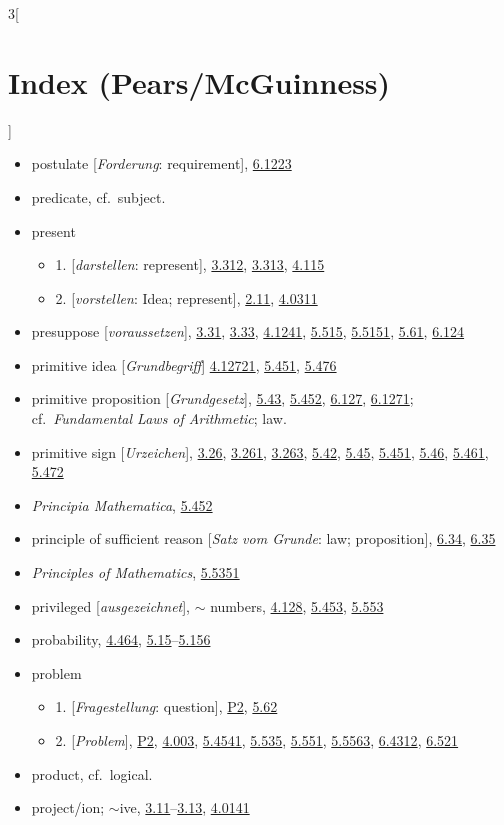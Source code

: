 \documentclass[oneside,openany,12pt]{book}
\newcommand{\indexentry}[1]{\item #1}
\newcommand{\indexsubentry}[1]{\begin{itemize} \item #1 \end{itemize}}
\newcommand{\indexref}[1]{\hyperlink{prop#1}{#1}}
\begin{document}
\begin{multicols}{3}[\section*{Index (Pears/McGuinness)}]
\begin{itemize}
\indexentry{postulate [\textit{Forderung}: requirement], \indexref{6.1223}}

\indexentry{predicate, cf.\ subject.}

\indexentry{present}

   \indexsubentry{1. [\textit{darstellen}: represent], \indexref{3.312}, \indexref{3.313}, \indexref{4.115}}

   \indexsubentry{2. [\textit{vorstellen}: Idea; represent], \indexref{2.11}, \indexref{4.0311}}

\indexentry{presuppose [\textit{voraussetzen}], \indexref{3.31}, \indexref{3.33}, \indexref{4.1241}, \indexref{5.515}, \indexref{5.5151}, \indexref{5.61}, \indexref{6.124}}

\indexentry{primitive idea [\textit{Grundbegriff}] \indexref{4.12721}, \indexref{5.451}, \indexref{5.476}}

\indexentry{primitive proposition [\textit{Grundgesetz}], \indexref{5.43}, \indexref{5.452}, \indexref{6.127}, \indexref{6.1271}; cf.\ \textit{Fundamental Laws of Arithmetic}; law.}

\indexentry{primitive sign [\textit{Urzeichen}], \indexref{3.26}, \indexref{3.261}, \indexref{3.263}, \indexref{5.42}, \indexref{5.45}, \indexref{5.451}, \indexref{5.46}, \indexref{5.461}, \indexref{5.472}}

\indexentry{\textit{Principia Mathematica}, \indexref{5.452}}

\indexentry{principle of sufficient reason [\textit{Satz vom Grunde}: law; proposition], \indexref{6.34}, \indexref{6.35}}

\indexentry{\textit{Principles of Mathematics}, \indexref{5.5351}}

\indexentry{privileged [\textit{ausgezeichnet}], $\sim$ numbers, \indexref{4.128}, \indexref{5.453}, \indexref{5.553}}

\indexentry{probability, \indexref{4.464}, \indexref{5.15}--\indexref{5.156}}

\indexentry{problem}

   \indexsubentry{1. [\textit{Fragestellung}: question], \hyperlink{pref2}{P2}, \indexref{5.62}}

   \indexsubentry{2. [\textit{Problem}], \hyperlink{pref2}{P2}, \indexref{4.003}, \indexref{5.4541}, \indexref{5.535}, \indexref{5.551}, \indexref{5.5563}, \indexref{6.4312}, \indexref{6.521}}

\indexentry{product, cf.\ logical.}

\indexentry{project/ion; $\sim$ive, \indexref{3.11}--\indexref{3.13}, \indexref{4.0141}}


\end{itemize}
\end{multicols}
\end{document}
